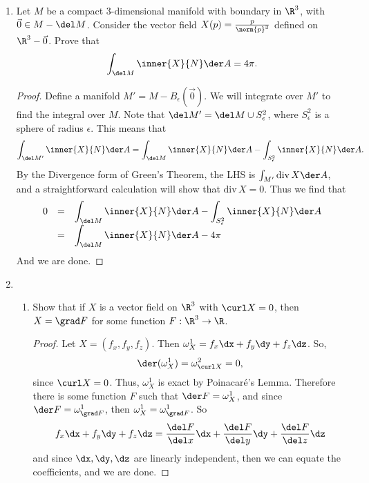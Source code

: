 \documentclass[letterpaper]{article}
\begin{document}
\begin{enumerate}
\item Let $M$ be a compact 3-dimensional manifold with boundary in $\R^3$, with $\vec{0}\in M-\del M$. Consider the vector field $X(p)=\frac{p}{\norm{p}^3}$ defined on $\R^3-\vec{0}$. Prove that 
$$\int_{\del M}\inner{X}{N}\der A = 4\pi.$$
\begin{proof}
Define a manifold $M'=M-B_\epsilon(\vec{0})$. We will integrate over $M'$ to find the integral over $M$. Note that $\del M' = \del M \cup S^2_\epsilon$, where $S^2_\epsilon$ is a sphere of radius $\epsilon$. This means that 
$$\int_{\del M'}\inner{X}{N}\der A = \int_{\del M}\inner{X}{N}\der A - \int_{S^2_\epsilon}\inner{X}{N}\der A.$$
By the Divergence form of Green's Theorem, the LHS is $\int_{M'}\text{div}\,X\der A$, and a straightforward calculation will show that $\text{div}\,X=0$. Thus we find that 
\[\begin{array}{rcl}
0 &=& \displaystyle\int_{\del M}\inner{X}{N}\der A - \displaystyle\int_{S^2_\epsilon}\inner{X}{N}\der A\\
&=& \displaystyle\int_{\del M}\inner{X}{N}\der A - 4\pi
\end{array}\]
And we are done. 

\begin{comment}
\[\begin{array}{rcl}
\displaystyle\int_{\del M}\inner{X}{N}\der A &=&\displaystyle\int_{\del M}\omega^2_X\\[2ex]
&=&\displaystyle\int_{\del M}\dfrac{x\dy\wedge\dz-y\dx\wedge\dz+z\dx\wedge\dy}{(x^2+y^2+z^2)^{3/2}}
\end{array}\]
?????????
\end{comment}

\end{proof}

\item 
	\begin{enumerate}
	\item Show that if $X$ is a vector field on $\R^3$ with $\curl X=0$, then $X =\grad F$ for some function $F:\R^3\to\R$. 
	

	\begin{proof} Let $X=(f_x, f_y, f_z)$. Then $\omega^1_X=f_x\dx + f_y\dy + f_z\dz$. So, 
	\[
	\der(\omega^1_X)=\omega^2_{\curl X}
	=0, \]
	since $\curl X=0$. Thus, $\omega^1_X$ is exact by Poinacar\'e's Lemma. Therefore there is some function $F$ such that $\der F=\omega^1_X$, and since $\der F = \omega^1_{\grad F}$, then $\omega^1_X = \omega^1_{\grad F}$. So 
	\[f_x\dx+f_y\dy+f_z\dz=\frac{\del F}{\del x}\dx + \frac{\del F}{\del y}\dy + \frac{\del F}{\del z}\dz\]
	and since $\dx, \dy, \dz$ are linearly independent, then we can equate the coefficients, and we are done. 
	


\end{proof}
\end{enumerate}
\end{enumerate}
\end{document}
